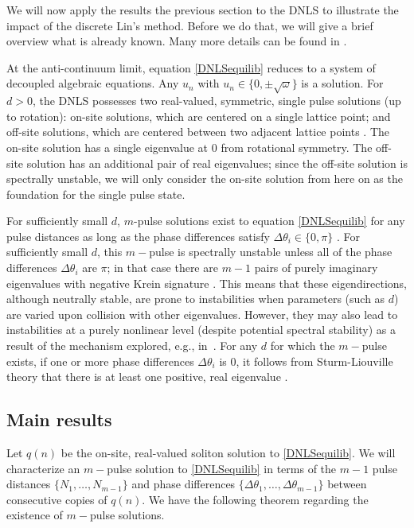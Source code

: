 \documentclass[12pt]{elsarticle}
\begin{document}
We will now apply the results the previous section to the 
DNLS to illustrate the impact of the discrete Lin's method. Before we do that, we will give a brief overview what is already known. Many more details can be found in \cite{Kevrekidis2009,pelinovsky_2011}. 

At the anti-continuum limit, equation \cref{DNLSequilib} reduces to a system of decoupled algebraic equations. Any $u_n$ with $u_n \in \{ 0, \pm \sqrt{\omega}\}$ is a solution. For $d > 0$, the DNLS possesses two real-valued, symmetric, single pulse solutions (up to rotation): on-site solutions, which are centered on a single lattice point; and off-site solutions, which are centered between two adjacent lattice points \cite{Kevrekidis2009}. The on-site solution has a single eigenvalue at 0 from rotational symmetry. The off-site solution has an additional pair of real eigenvalues; since the off-site solution is spectrally unstable, we will only consider the on-site solution from here on as the foundation for the 
single pulse state. 

For sufficiently small $d$, $m$-pulse solutions exist to equation \cref{DNLSequilib} for any pulse distances as long as the phase differences satisfy $\Delta \theta_i \in \{0, \pi\}$ \cite[Proposition 2.1]{Pelinovsky2005}. For sufficiently small $d$, this $m-$pulse is spectrally unstable unless all of the phase differences $\Delta \theta_i$ are $\pi$; in that case there are $m-1$ pairs of purely imaginary eigenvalues with negative Krein signature \cite[Theorem 3.6]{Pelinovsky2005}.
This means that these eigendirections, although neutrally
stable, are prone to instabilities when parameters 
(such as $d$) are varied upon collision with other
eigenvalues. However, they may also lead to instabilities
at a purely nonlinear level (despite potential spectral
stability) as a result of the mechanism explored, e.g.,
in~\cite{CUCCAGNA200938,PRL_2015}.
For any $d$ for which the $m-$pulse exists, if one or more phase differences $\Delta \theta_i$ is 0, it follows from Sturm-Liouville theory that there is at least one positive, real eigenvalue \cite{Kapitula2001a}.

\subsection{Main results}

Let $q(n)$ be the on-site, real-valued soliton solution to \cref{DNLSequilib}. We will characterize an $m-$pulse solution to \cref{DNLSequilib} in terms of the $m-1$ pulse distances $\{ N_1, \dots, N_{m-1} \}$ and phase differences $\{ \Delta\theta_1, \dots, \Delta\theta_{m-1} \}$ between consecutive copies of $q(n)$. We have the following theorem regarding the existence of $m-$pulse solutions.
\end{document}
